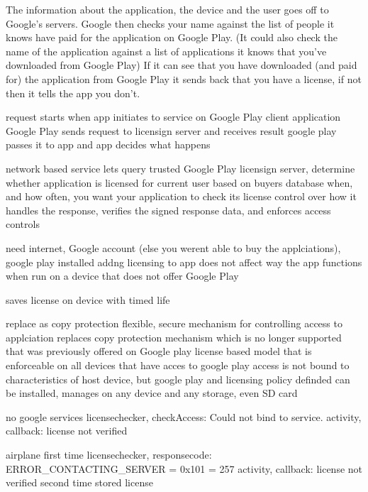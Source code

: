 The information about the application, the device and the user goes off to Google's servers.
Google then checks your name against the list of people it knows have paid for the application on Google Play. (It could also check the name of the application against a list of applications it knows that you've downloaded from Google Play)
If it can see that you have downloaded (and paid for) the application from Google Play it sends back that you have a license, if not then it tells the app you don't.

%
request starts when app initiates to service on Google Play client application
Google Play sends request to licensign server and receives result
google play passes it to app and app decides what happens
\cite{developersLicensingOverview}
%


%
network based service lets query trusted Google Play licensign server, determine whether application is licensed for current user based on buyers database
when, and how often, you want your application to check its license
control over how it handles the response, verifies the signed response data, and enforces access controls

need internet, Google account (else you werent able to buy the applciations), google play installed
addng licensing to app does not affect way the app functions when run on a device that does not offer Google Play

saves license on device with timed life

replace as copy protection
flexible, secure mechanism for controlling access to applciation
replaces copy protection mechanism which is no longer supported that was previously offered on Google play
license based model that is enforceable on all devices that have acces to google play
access is not bound to characteristics of host device, but google play and licensing policy definded
can be installed, manages on any device and any storage, even SD card
\cite{developersLicensingOverview}
%


no google services
licensechecker, checkAccess: Could not bind to service.
activity, callback: license not verified

airplane
first time
licensechecker, responsecode: ERROR\_CONTACTING\_SERVER = 0x101 = 257
activity, callback: license not verified
second time
stored license\cite{developersLicensingAdding}
